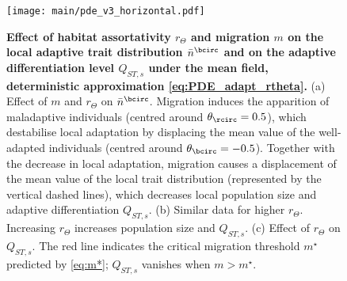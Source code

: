 \begin{figure}[ht]
  \centering
  \texttt{[image: main/pde\_v3\_horizontal.pdf]}
    \caption{\textbf{Effect of habitat assortativity $r_\Theta$ and migration $m$ on the local adaptive trait distribution $\bar{n}^{\bcirc}$ and on the adaptive differentiation level $Q_{ST,s}$ under the mean field, deterministic approximation \cref{eq:PDE_adapt_rtheta}.} (a) Effect of $m$ and $r_\Theta$ on $\bar{n}^{\bcirc}$. Migration induces the apparition of maladaptive individuals (centred around $\theta_{\rcirc} = 0.5$), which destabilise local adaptation by displacing the mean value of the well-adapted individuals (centred around $\theta_{\bcirc} = -0.5$). Together with the decrease in local adaptation, migration causes a displacement of the mean value of the local trait distribution (represented by the vertical dashed lines), which decreases local population size and adaptive differentiation $Q_{ST,s}$. (b) Similar data for higher $r_\Theta$. Increasing $r_\Theta$ increases population size and $Q_{ST,s}$. (c) Effect of $r_\Theta$ on $Q_{ST,s}$. The red line indicates the critical migration threshold $m^\star$ predicted by \cref{eq:m*}; $Q_{ST,s}$ vanishes when $m > m^\star$.}\label{fig:heatmap_betas_m_rtheta}
\end{figure}
\FloatBarrier


